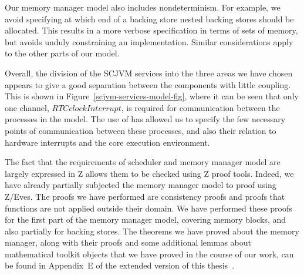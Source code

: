 {Our memory manager model also includes nondeterminism.
For example, we avoid specifying at which end of a backing store
nested backing stores should be allocated.
This results in a more verbose specification in terms of sets
of memory, but avoids unduly constraining an implementation.
Similar considerations apply to the other parts of our model.
}

Overall, the division of the SCJVM services into the three areas we
have chosen appears to give a good separation between the components
with little coupling.
This is shown in Figure~\ref{scjvm-services-model-fig}, where it can
be seen that only one channel, $RTCclockInterrupt$, is required for
communication between the processes in the model.
The use of \Circus{} has allowed us to specify the few necessary
points of communication between these processes, and also their
relation to hardware interrupts and the core execution environment.

The fact that the requirements of scheduler and memory manager model
are largely expressed in Z allows them to be checked using Z proof
tools.
Indeed, we have already partially subjected the memory manager model
to proof using Z/Eves.
The proofs we have performed are consistency proofs and proofs that
functions are not applied outside their domain.
We have performed these proofs for the first part of the memory
manager model, covering memory blocks, and also partially for backing
stores.
The theorems we have proved about the memory manager, along with their
proofs and some additional lemmas about mathematical toolkit objects
that we have proved in the course of our work, can be found in
Appendix~E of the extended version of this
thesis~\cite{baxter2018-extended}.

